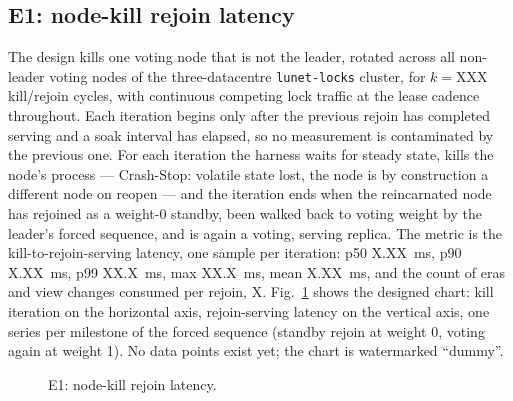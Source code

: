 \documentclass[10pt,journal,letterpaper]{IEEEtran}
\newcommand{\code}[1]{\texttt{#1}}
\begin{document}
\subsection{E1: node-kill rejoin latency}
The design kills one voting node that is not the leader, rotated across all
non-leader voting nodes of the three-datacentre \code{lunet-locks} cluster,
for $k=\mathrm{XXX}$ kill/rejoin cycles, with continuous competing lock
traffic at the lease cadence throughout. Each iteration begins only after
the previous rejoin has completed serving and a soak interval has elapsed,
so no measurement is contaminated by the previous one. For each iteration
the harness waits for steady state, kills the node's process --- Crash-Stop:
volatile state lost, the node is by construction a different node on reopen
--- and the iteration ends when the reincarnated node has rejoined as a
weight-0 standby, been walked back to voting weight by the leader's forced
sequence, and is again a voting, serving replica. The metric is the
kill-to-rejoin-serving latency, one sample per iteration: p50
X.XX~ms, p90 X.XX~ms, p99 XX.X~ms, max
XX.X~ms, mean X.XX~ms, and the count of eras and view
changes consumed per rejoin, X. Fig.~\ref{fig:e1} shows the
designed chart: kill iteration on the horizontal axis, rejoin-serving
latency on the vertical axis, one series per milestone of the forced
sequence (standby rejoin at weight 0, voting again at weight 1). No data
points exist yet; the chart is watermarked ``dummy''.

\begin{figure}[t]
\centering
{}
\caption{E1: node-kill rejoin latency.}
\label{fig:e1}
\end{figure}
\end{document}
